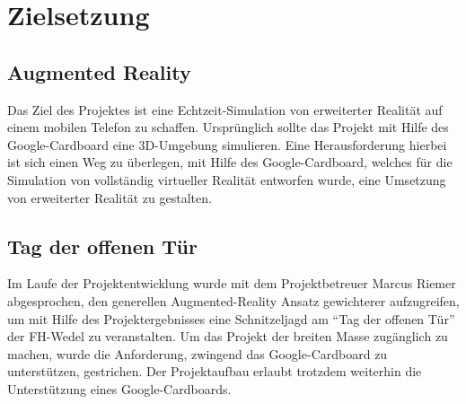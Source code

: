 \chapter{Zielsetzung}
\section{Augmented Reality}
Das Ziel des Projektes ist eine Echtzeit-Simulation von erweiterter Realität auf einem mobilen Telefon zu schaffen. Ursprünglich sollte das Projekt mit Hilfe des Google-Cardboard eine 3D-Umgebung simulieren. Eine Herausforderung hierbei ist sich einen Weg zu überlegen, mit Hilfe des Google-Cardboard, welches für die Simulation von vollständig virtueller Realität entworfen wurde, eine Umsetzung von erweiterter Realität zu gestalten.

\section{Tag der offenen Tür}
Im Laufe der Projektentwicklung wurde mit dem Projektbetreuer Marcus Riemer abgesprochen, den generellen Augmented-Reality Ansatz gewichterer aufzugreifen, um mit Hilfe des Projektergebnisses eine Schnitzeljagd am “Tag der offenen Tür” der FH-Wedel zu veranstalten. Um das Projekt der breiten Masse zugänglich zu machen, wurde die Anforderung, zwingend das Google-Cardboard zu unterstützen, gestrichen. Der Projektaufbau erlaubt trotzdem weiterhin die Unterstützung eines Google-Cardboards.